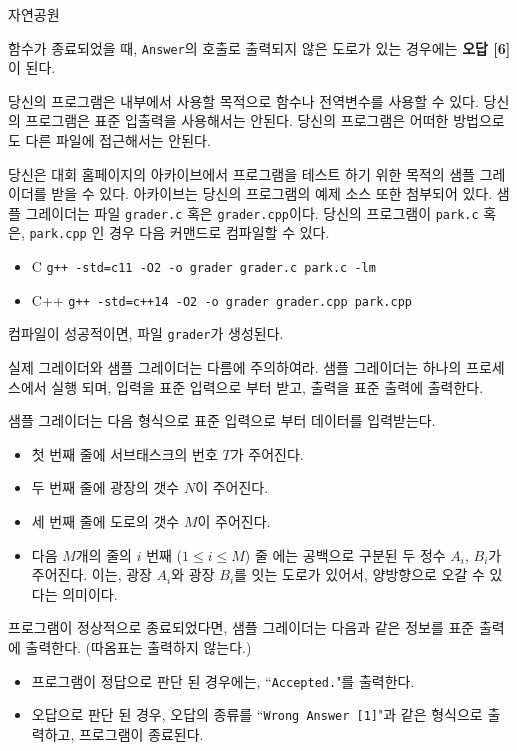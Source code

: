 \begin{problem}{자연공원}
\begin{itemize}
	\end{itemize}

	함수가 종료되었을 때, \texttt{Answer}의 호출로 출력되지 않은 도로가 있는 경우에는 \textbf{오답 [6]}이 된다.
	
	당신의 프로그램은 내부에서 사용할 목적으로 함수나 전역변수를 사용할 수 있다. 당신의 프로그램은 표준 입출력을 사용해서는 안된다. 당신의 프로그램은 어떠한 방법으로도 다른 파일에 접근해서는 안된다. 
	
	당신은 대회 홈페이지의 아카이브에서 프로그램을 테스트 하기 위한 목적의 샘플 그레이더를 받을 수 있다. 아카이브는 당신의 프로그램의 예제 소스 또한 첨부되어 있다.
	샘플 그레이더는 파일 \texttt{grader.c} 혹은 \texttt{grader.cpp}이다. 당신의 프로그램이 \texttt{park.c} 혹은, \texttt{park.cpp} 인 경우 다음 커맨드로 컴파일할 수 있다.
	
	\begin{itemize}
		\item C
		\texttt{g++ -std=c11 -O2 -o grader grader.c park.c -lm}
		\item C++
		\texttt{g++ -std=c++14 -O2 -o grader grader.cpp park.cpp}
	\end{itemize}
	
	컴파일이 성공적이면, 파일 \texttt{grader}가 생성된다.
	
	실제 그레이더와 샘플 그레이더는 다름에 주의하여라. 샘플 그레이더는 하나의 프로세스에서 실행 되며, 입력을 표준 입력으로 부터 받고, 출력을 표준 출력에 출력한다.
	
	\InputFile
	
	샘플 그레이더는 다음 형식으로 표준 입력으로 부터 데이터를 입력받는다.
	
	\begin{itemize}
		\item 첫 번째 줄에 서브태스크의 번호 $T$가 주어진다.
		\item 두 번째 줄에 광장의 갯수 $N$이 주어진다.
		\item 세 번째 줄에 도로의 갯수 $M$이 주어진다.
		\item 다음 $M$개의 줄의 $i$ 번째 ($1 \le i \le M$) 줄 에는 공백으로 구분된 두 정수 $A_i$, $B_i$가 주어진다. 이는, 광장 $A_i$와 광장 $B_i$를 잇는 도로가 있어서, 양방향으로 오갈 수 있다는 의미이다.
	\end{itemize}
	
	
	\OutputFile
	
	프로그램이 정상적으로 종료되었다면, 샘플 그레이더는 다음과 같은 정보를 표준 출력에 출력한다. (따옴표는 출력하지 않는다.)
	
	\begin{itemize}
		\item 프로그램이 정답으로 판단 된 경우에는,  ``\texttt{Accepted.}"를 출력한다.
		\item 오답으로 판단 된 경우, 오답의 종류를 ``\texttt{Wrong Answer [1]}"과 같은 형식으로 출력하고, 프로그램이 종료된다.
	\end{itemize}
	

\end{problem}
